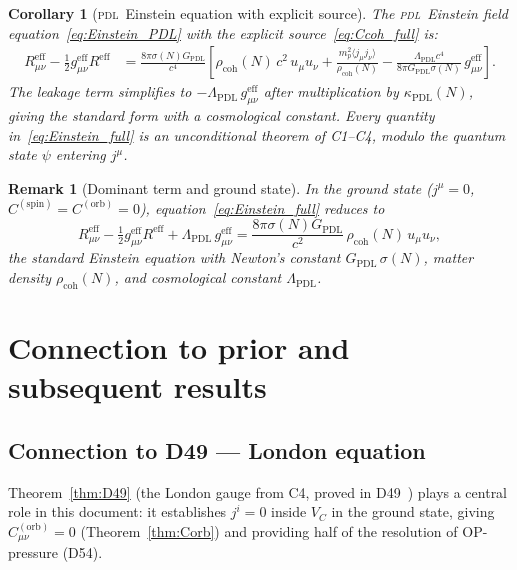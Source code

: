 \documentclass[12pt,a4paper]{article}
\newtheorem{corollary}[theorem]{Corollary}
\newtheorem{remark}[theorem]{Remark}
\newcommand{\PDL}{\textsc{pdl}}
\newcommand{\Cspin}{C^{(\mathrm{spin})}}
\newcommand{\Corb}{C^{(\mathrm{orb})}}
\newcommand{\rhocoh}{\rho_{\mathrm{coh}}}
\newcommand{\sig}{\sigma}
\newcommand{\kPDL}{\kappa_{\mathrm{PDL}}}
\newcommand{\GPDL}{G_{\mathrm{PDL}}}
\newcommand{\geff}{g_{\mu\nu}^{\mathrm{eff}}}
\newcommand{\VC}{V_C}
\newcommand{\LambdaPDL}{\Lambda_{\mathrm{PDL}}}
\begin{document}
\begin{corollary}[\PDL\ Einstein equation with explicit source]
\label{cor:Einstein_explicit}
The \PDL\ Einstein field equation~\eqref{eq:Einstein_PDL} with the explicit source~\eqref{eq:Ccoh_full} is:
\begin{align}
R_{\mu\nu}^{\mathrm{eff}} - \tfrac{1}{2}\geff R^{\mathrm{eff}} &= \frac{8\pi\sig(N)\GPDL}{c^4}\left[\rhocoh(N)\,c^2\,u_\mu u_\nu + \frac{m_p^2\langle j_\mu j_\nu\rangle}{\rhocoh(N)} - \frac{\LambdaPDL c^4}{8\pi\GPDL\sig(N)}\,\geff\right].
\label{eq:Einstein_full}
\end{align}
The leakage term simplifies to $-\LambdaPDL\,\geff$ after multiplication by $\kPDL(N)$, giving the standard form with a cosmological constant. Every quantity in~\eqref{eq:Einstein_full} is an unconditional theorem of C1--C4, modulo the quantum state $\psi$ entering $j^\mu$.
\end{corollary}

\begin{remark}[Dominant term and ground state]
In the ground state ($j^\mu = 0$, $\Cspin = \Corb = 0$), equation~\eqref{eq:Einstein_full} reduces to
\begin{equation}
R_{\mu\nu}^{\mathrm{eff}} - \tfrac{1}{2}\geff R^{\mathrm{eff}} + \LambdaPDL\,\geff = \frac{8\pi\sig(N)\GPDL}{c^2}\,\rhocoh(N)\,u_\mu u_\nu,
\end{equation}
the standard Einstein equation with Newton's constant $\GPDL\,\sig(N)$, matter density $\rhocoh(N)$, and cosmological constant $\LambdaPDL$.
\end{remark}

\section{Connection to prior and subsequent results}
\label{sec:connection}

\subsection{Connection to D49 --- London equation}

Theorem~\ref{thm:D49} (the London gauge from C4, proved in D49~\cite{PDL_D49_2026}) plays a central role in this document: it establishes $j^i = 0$ inside $\VC$ in the ground state, giving $\Corb_{\mu\nu} = 0$ (Theorem~\ref{thm:Corb}) and providing half of the resolution of OP-pressure (D54).
\end{document}
